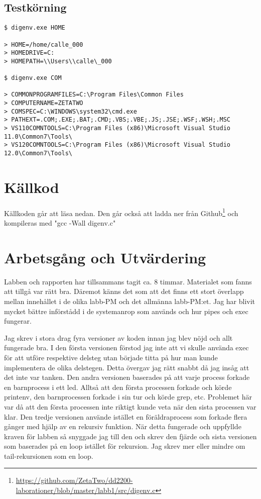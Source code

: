 \documentclass[10pt,a4paper]{article}
\begin{document}
\subsection{Testkörning}

\begin{lstlisting}
$ digenv.exe HOME

> HOME=/home/calle_000
> HOMEDRIVE=C:
> HOMEPATH=\\Users\\calle\_000

$ digenv.exe COM

> COMMONPROGRAMFILES=C:\Program Files\Common Files
> COMPUTERNAME=ZETATWO
> COMSPEC=C:\WINDOWS\system32\cmd.exe
> PATHEXT=.COM;.EXE;.BAT;.CMD;.VBS;.VBE;.JS;.JSE;.WSF;.WSH;.MSC
> VS110COMNTOOLS=C:\Program Files (x86)\Microsoft Visual Studio 11.0\Common7\Tools\
> VS120COMNTOOLS=C:\Program Files (x86)\Microsoft Visual Studio 12.0\Common7\Tools\
\end{lstlisting}


\clearpage
\section{Källkod}
Källkoden går att läsa nedan. Den går också att ladda ner från Github\footnote{\url{https://github.com/ZetaTwo/dd2200-laborationer/blob/master/labb1/src/digenv.c}} och kompileras med "gcc -Wall digenv.c"

\clearpage

\section{Arbetsgång och Utvärdering}

Labben och rapporten har tillsammans tagit ca. 8 timmar. Materialet som fanns att tillgå var rätt bra. Däremot känns det som att det finns ett stort överlapp mellan innehållet i de olika labb-PM och det allmänna labb-PM:et. Jag har blivit mycket bättre införstådd i de systemanrop som används och hur pipes och exec fungerar.

Jag skrev i stora drag fyra versioner av koden innan jag blev nöjd och allt fungerade bra. I den första versionen förstod jag inte att vi skulle använda exec för att utföre respektive delsteg utan började titta på hur man kunde implementera de olika delstegen. Detta övergav jag rätt snabbt då jag insåg att det inte var tanken. Den andra versionen baserades på att varje process forkade en barnprocess i ett led. Alltså att den första processen forkade och körde printenv, den barnprocessen forkade i sin tur och körde grep, etc. Problemet här var då att den första processen inte riktigt kunde veta när den sista processen var klar. Den tredje versionen använde istället en föräldraprocess som forkade flera gånger med hjälp av en rekursiv funktion. När detta fungerade och uppfyllde kraven för labben så snyggade jag till den och skrev den fjärde och sista versionen som baserades på en loop istället för rekursion. Jag skrev mer eller mindre om tail-rekursionen som en loop.
\end{document}
